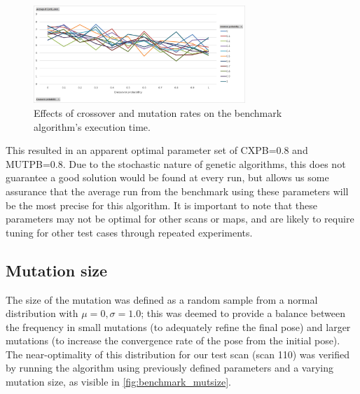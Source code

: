 \documentclass[authoryearcitations]{UoYCSproject}
\begin{document}
\begin{figure}[ht]
\centering
	\includegraphics[width=8cm,keepaspectratio]{images/ga_cxpb_mutpb.png}
	\caption[Optimising cross and mutation rate for benchmark algorithm.]{Effects of crossover and mutation rates on the benchmark algorithm's execution time.}
	\label{fig:ga_cxpb_mutpb}
\end{figure}

 This resulted in an apparent optimal parameter set of CXPB=0.8 and MUTPB=0.8. Due to the stochastic nature of genetic algorithms, this does not guarantee a good solution would be found at every run, but allows us some assurance that the average run from the benchmark using these parameters will be the most precise for this algorithm. It is important to note that these parameters may not be optimal for other scans or maps, and are likely to require tuning for other test cases through repeated experiments. 


\subsection{Mutation size}

\datatablebenchmarkmutsize



The size of the mutation was defined as a random sample from a normal distribution with $\mu=0, \sigma=1.0$; this was deemed to provide a balance between the frequency in small mutations (to adequately refine the final pose) and larger mutations (to increase the convergence rate of the pose from the initial pose). The near-optimality of this distribution for our test scan (scan 110) was verified by running the algorithm using previously defined parameters and a varying mutation size, as visible in \autoref{fig:benchmark_mutsize}.
\end{document}
